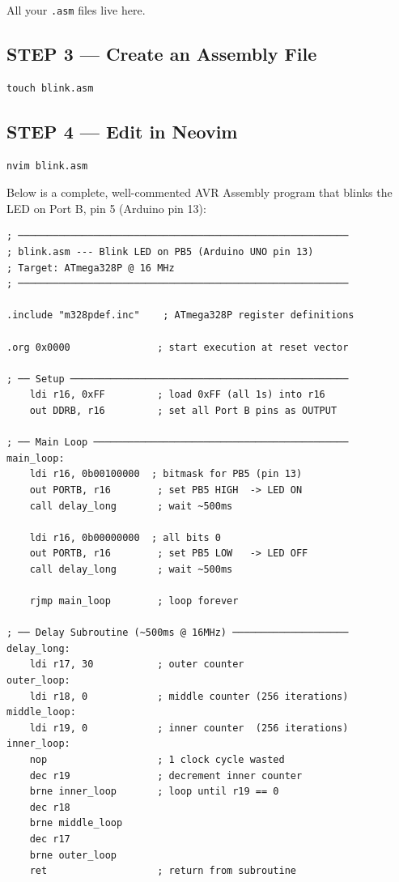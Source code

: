 \documentclass[12pt,a4paper,openany]{report}
\begin{document}
All your \texttt{.asm} files live here.

\subsection{STEP 3 --- Create an Assembly File}

\begin{lstlisting}[style=shell]
touch blink.asm
\end{lstlisting}

\subsection{STEP 4 --- Edit in Neovim}

\begin{lstlisting}[style=shell]
nvim blink.asm
\end{lstlisting}

Below is a complete, well-commented AVR Assembly program that blinks the LED on Port B, pin 5 (Arduino pin 13):

\begin{lstlisting}[style=asmstyle, caption={blink.asm --- LED blink in AVR Assembly}]
; ─────────────────────────────────────────────────────────
; blink.asm --- Blink LED on PB5 (Arduino UNO pin 13)
; Target: ATmega328P @ 16 MHz
; ─────────────────────────────────────────────────────────

.include "m328pdef.inc"    ; ATmega328P register definitions

.org 0x0000               ; start execution at reset vector

; ── Setup ────────────────────────────────────────────────
    ldi r16, 0xFF         ; load 0xFF (all 1s) into r16
    out DDRB, r16         ; set all Port B pins as OUTPUT

; ── Main Loop ────────────────────────────────────────────
main_loop:
    ldi r16, 0b00100000  ; bitmask for PB5 (pin 13)
    out PORTB, r16        ; set PB5 HIGH  -> LED ON
    call delay_long       ; wait ~500ms

    ldi r16, 0b00000000  ; all bits 0
    out PORTB, r16        ; set PB5 LOW   -> LED OFF
    call delay_long       ; wait ~500ms

    rjmp main_loop        ; loop forever

; ── Delay Subroutine (~500ms @ 16MHz) ────────────────────
delay_long:
    ldi r17, 30           ; outer counter
outer_loop:
    ldi r18, 0            ; middle counter (256 iterations)
middle_loop:
    ldi r19, 0            ; inner counter  (256 iterations)
inner_loop:
    nop                   ; 1 clock cycle wasted
    dec r19               ; decrement inner counter
    brne inner_loop       ; loop until r19 == 0
    dec r18
    brne middle_loop
    dec r17
    brne outer_loop
    ret                   ; return from subroutine
\end{lstlisting}
\end{document}
